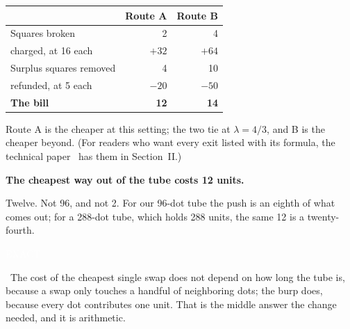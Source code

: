 \documentclass[11pt,letterpaper]{article}
\newcommand{\tagbox}[2]{{\sffamily\scriptsize\colorbox{#1}{\textcolor{white}{\strut #2}}}}
\newcommand{\Exact}{\tagbox{kExact}{EXACT}}
\begin{document}
\begin{center}
\renewcommand{\arraystretch}{1.2}
\begin{tabular}{lrr}
\toprule
 & Route A & Route B \\
\midrule
Squares broken & 2 & 4 \\
\quad charged, at 16 each & $+32$ & $+64$ \\
Surplus squares removed & 4 & 10 \\
\quad refunded, at 5 each & $-20$ & $-50$ \\
\midrule
\textbf{The bill} & \textbf{12} & \textbf{14} \\
\bottomrule
\end{tabular}
\end{center}

Route A is the cheaper at this setting; the two tie at $\lambda = 4/3$, and B is the cheaper beyond.
(For readers who want every exit listed with its formula, the technical paper~\cite{tech} has them in
Section~II.)

\begin{center}
{\color{ink}\LARGE\bfseries The cheapest way out of the tube costs 12 units.}
\end{center}

Twelve. Not 96, and not 2. For our 96-dot tube the push is an eighth of what comes out; for a
288-dot tube, which holds 288 units, the same 12 is a twenty-fourth. \Exact\ The cost of the cheapest
single swap does not depend on how long the tube is, because a swap only touches a handful of
neighboring dots; the burp does, because every dot contributes one unit. That is the middle answer
the change needed, and it is arithmetic.
\end{document}
